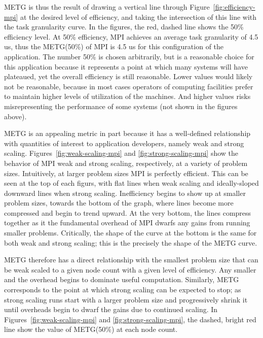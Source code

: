 METG is thus the result of drawing a vertical line through
Figure~\ref{fig:efficiency-mpi} at the desired level of efficiency,
and taking the intersection of this line with the task granularity
curve. In the figures, the red, dashed line shows the 50\% efficiency
level. At 50\% efficiency, MPI achieves an average task granularity of
4.5 us, thus the METG(50\%) of MPI is 4.5 us for this configuration of
the application. The number 50\% is chosen arbitrarily, but is a
reasonable choice for this application because it represents a point
at which many systems will have plateaued, yet the overall efficiency
is still reasonable. Lower values would likely not be reasonable,
because in most cases operators of computing facilities prefer to
maintain higher levels of utilization of the machines. And higher
values risks misrepresenting the performance of some systems (not
shown in the figures above).

METG is an appealing metric in part because it has a well-defined
relationship with quantities of interest to application developers,
namely weak and strong scaling. Figures~\ref{fig:weak-scaling-mpi} and
\ref{fig:strong-scaling-mpi} show the behavior of MPI weak and strong
scaling, respectively, at a variety of problem sizes. Intuitively, at
larger problem sizes MPI is perfectly efficient. This can be seen at
the top of each figurs, with flat lines when weak scaling and
ideally-sloped downward lines when strong scaling. Inefficiency begins
to show up at smaller problem sizes, towards the bottom of the graph,
where lines become more compressed and begin to trend upward. At the
very bottom, the lines compress together as it the fundamental
overhead of MPI dwarfs any gains from running smaller
problems. Critically, the shape of the curve at the bottom is the same
for both weak and strong scaling; this is the precisely the shape of
the METG curve.




METG therefore has a direct relationship with the smallest problem
size that can be weak scaled to a given node count with a given level
of efficiency. Any smaller and the overhead begins to dominate useful
computation. Similarly, METG corresponds to the point at which strong
scaling can be expected to stop; as strong scaling runs start with a
larger problem size and progressively shrink it until overheads begin
to dwarf the gains due to continued scaling. In
Figures~\ref{fig:weak-scaling-mpi} and \ref{fig:strong-scaling-mpi},
the dashed, bright red line show the value of METG(50\%) at each node
count.

